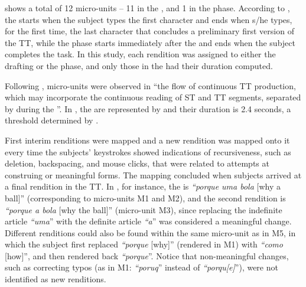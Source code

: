 \documentclass[output=paper]{LSP/langsci}
\begin{document}
 shows a total of 12 micro-units -- 11 in the , and 1 in the  phase. According to \citet{Jakobsen2002Translation}, the  starts when the subject types the first character and ends when s/he types, for the first time, the last character that concludes a preliminary first version of the TT, while the  phase starts immediately after the  and ends when the subject completes the task. In this study, each rendition was assigned to either the drafting or the  phase, and only those in the  had their duration computed.


Following \citet[107]{Alves2011On}, micro-units were observed in ``the flow of continuous TT production, which may incorporate the continuous reading of ST and TT segments, separated by  during the ''. In , the  are represented by \wdpause and their duration is 2.4 seconds, a threshold determined by \citet{Jakobsen2005Instances}. 

  
First interim renditions were mapped and a new rendition was mapped onto it every time the subjects' keystrokes showed indications of recursiveness, such as deletion, backspacing, and mouse clicks, that were related to attempts at construing or  meaningful forms. The mapping concluded when subjects arrived at a final rendition in the TT. In , for instance, the  is \textit{``porque uma bola} [why a ball]'' (corresponding to micro-units M1 and M2), and the second rendition is \textit{``porque a bola} [why the ball]'' (micro-unit M3), since replacing the indefinite article \textit{``uma}'' with the definite article \textit{``a}'' was considered a meaningful change. Different renditions could also be found within the same micro-unit as in M5, in which the subject first replaced \textit{``porque} [why]'' (rendered in M1) with \textit{``como} [how]'', and then rendered back \textit{``porque}''. Notice that non-meaningful changes, such as correcting typos (as in M1: \textit{``poruq}'' instead of \textit{``porqu[e]}''), were not identified as new renditions. 
\end{document}
